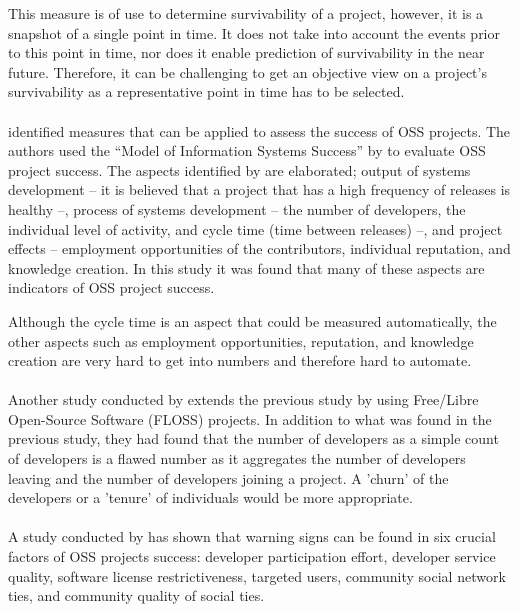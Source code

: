 This measure is of use to determine survivability of a project, however, it is
a snapshot of a single point in time. It does not take into account the events
prior to this point in time, nor does it enable prediction of survivability in
the near future. Therefore, it can be challenging to get an objective view on a
project's survivability as a representative point in time has to be selected.

\paragraph{}
\citet{crowston2003} identified measures that can be applied to assess the
success of OSS projects. The authors used the ``Model of Information Systems
Success'' by \citet{delone1992} to evaluate OSS project success. The aspects
identified by \citeauthor{delone1992} are elaborated; output of systems
development -- it is believed that a project that has a high frequency of
releases is healthy --, process of systems development -- the number of
developers, the individual level of activity, and cycle time (time between
releases) --, and project effects -- employment opportunities of the
contributors, individual reputation, and knowledge creation. In this study it
was found that many of these aspects are indicators of OSS project success.

Although the cycle time is an aspect that could be measured automatically, the
other aspects such as employment opportunities, reputation, and knowledge
creation are very hard to get into numbers and therefore hard to automate.

\paragraph{}
Another study conducted by \citet{crowston2006} extends the previous study by
using Free/Libre Open-Source Software (FLOSS) projects. In addition to what was
found in the previous study, they had found that the number of developers as a
simple count of developers is a flawed number as it aggregates the number of
developers leaving and the number of developers joining a project. A 'churn' of
the developers or a 'tenure' of individuals would be more appropriate.

\paragraph{}
A study conducted by \citet{wang2012} has shown that warning signs can be found
in six crucial factors of OSS projects success: developer participation effort,
developer service quality, software license restrictiveness, targeted users,
community social network ties, and community quality of social ties.

